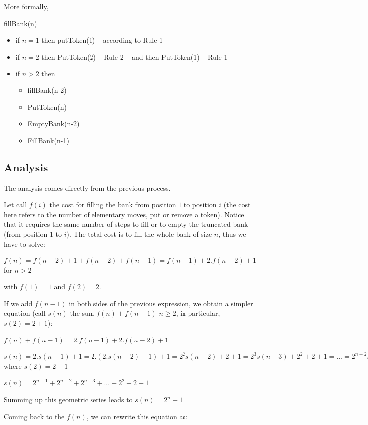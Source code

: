 {More formally,
\bigskip

fillBank(n)
\begin{itemize}
\item
 if $n=1$ then putToken(1) -- according to Rule 1
\item
if $n=2$ then PutToken(2) -- Rule 2 -- and then PutToken(1) -- Rule 1

\item 
if $n > 2$ then
\begin{itemize}
\item fillBank(n-2)
\item PutToken(n)
\item EmptyBank(n-2)
\item FillBank(n-1)
\end{itemize}
\end{itemize}

\subsection{Analysis}

The analysis comes directly from the previous process. 

Let call $f(i)$ the cost for filling the bank from position $1$ to position $i$
(the cost here refers to the number of elementary moves, put or remove a token).
Notice that it requires the same number of steps to fill or to empty the truncated bank (from position $1$ to $i$). 
The total cost is to fill the whole bank of size $n$, thus we have to solve:

$f(n) = f(n-2) + 1 + f(n-2) + f(n-1) = f(n-1) + 2.f(n-2) +1$ for $n > 2$

with $f(1) = 1$ and $f(2) = 2$.
\bigskip

If we add $f(n-1)$ in both sides of the previous expression, we obtain a simpler equation (call $s(n)$ the sum $f(n)+f(n-1)$ $n \geq 2$,
in particular, $s(2) = 2+1$):

$f(n) + f(n-1) = 2.f(n-1) + 2.f(n-2) +1$

$s(n) = 2.s(n-1)+1 = 2.(2.s(n-2)+1) + 1 = 2^2 s(n-2) + 2+ 1 = 2^3 s(n-3) + 2^2 + 2 + 1 = ... = 2^{n-2} s(2) + 2^{n-3} + ... + 2^2 + 2 + 1$ where $s(2) = 2+1$

$s(n) = 2^{n-1} + 2^{n-2} + 2^{n-3} + ... + 2^2 + 2 + 1$ 

Summing up this geometric series leads to
$s(n) = 2^{n} -1$
\bigskip

Coming back to the $f(n)$, we can rewrite this equation as:

}
